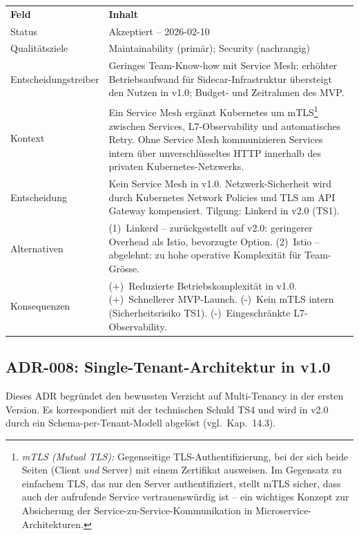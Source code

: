 \begin{tabularx}{\textwidth}{L{3.5cm} X}
  \color{white}\textbf{Feld} & \color{white}\textbf{Inhalt} \\
  Status & Akzeptiert -- 2026-02-10 \\
  Qualitätsziele & Maintainability (primär); Security (nachrangig) \\
  Entscheidungstreiber & Geringes Team-Know-how mit Service Mesh; erhöhter Betriebsaufwand für Sidecar-Infrastruktur übersteigt den Nutzen in v1.0; Budget- und Zeitrahmen des MVP. \\
  Kontext & Ein Service Mesh ergänzt Kubernetes um mTLS\footnote{%
    \textit{mTLS (Mutual TLS):} Gegenseitige TLS-Authentifizierung, bei der sich beide Seiten
    (Client \textit{und} Server) mit einem Zertifikat ausweisen. Im Gegensatz zu einfachem TLS,
    das nur den Server authentifiziert, stellt mTLS sicher, dass auch der aufrufende Service
    vertrauenswürdig ist -- ein wichtiges Konzept zur Absicherung der Service-zu-Service-Kommunikation
    in Microservice-Architekturen.}
  zwischen Services, L7-Observability und automatisches Retry. Ohne Service Mesh kommunizieren
  Services intern über unverschlüsseltes HTTP innerhalb des privaten Kubernetes-Netzwerks. \\
  Entscheidung & Kein Service Mesh in v1.0. Netzwerk-Sicherheit wird durch Kubernetes Network Policies und TLS am API Gateway kompensiert. Tilgung: Linkerd in v2.0 (TS1). \\
  Alternativen & (1)~Linkerd -- zurückgestellt auf v2.0: geringerer Overhead als Istio, bevorzugte Option. (2)~Istio -- abgelehnt: zu hohe operative Komplexität für Team-Grösse. \\
  Konsequenzen & (+)~Reduzierte Betriebskomplexität in v1.0. (+)~Schnellerer MVP-Launch. (-)~Kein mTLS intern (Sicherheitsrisiko TS1). (-)~Eingeschränkte L7-Observability. \\
\end{tabularx}

\subsection{ADR-008: Single-Tenant-Architektur in v1.0}

Dieses ADR begründet den bewussten Verzicht auf Multi-Tenancy in der ersten Version.
Es korrespondiert mit der technischen Schuld TS4 und wird in v2.0 durch ein
Schema-per-Tenant-Modell abgelöst (vgl.\ Kap.~14.3).

